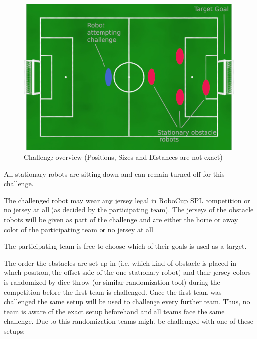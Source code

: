 \begin{figure}[ht]
    \centering
    \includegraphics[width=1.0\textwidth]{figs/obstacle_challenge_2021.jpeg}
	\caption{Challenge overview (Positions, Sizes and Distances are not exact)}
\end{figure}

All stationary robots are sitting down and can remain turned off for this challenge.

The challenged robot may wear any jersey legal in RoboCup SPL competition or no jersey at all (as decided by the participating team). The jerseys of the obstacle robots will be given as part of the challenge and are either the home or away color of the participating team or no jersey at all.

The participating team is free to choose which of their goals is used as a target.

The order the obstacles are set up in (i.e. which kind of obstacle is placed in which position, the offset side of the one stationary robot) and their jersey colors is randomized by dice throw (or similar randomization tool) during the competition before the first team is challenged. Once the first team was challenged the same setup will be used to challenge every further team. Thus, no team is aware of the exact setup beforehand and all teams face the same challenge. Due to this randomization teams might be challenged with one of these setups:

